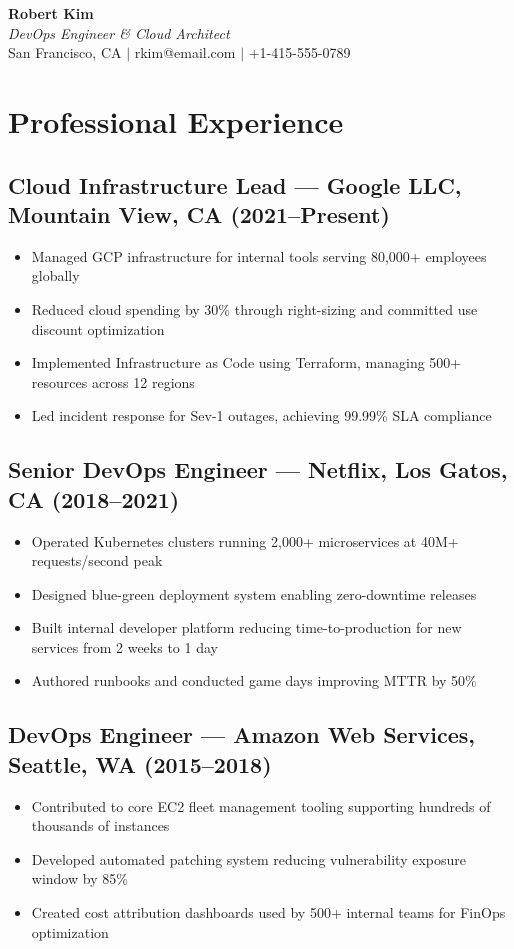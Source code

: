 \documentclass[10pt,letterpaper]{article}
\begin{document}
\begin{center}
  {\Huge\textbf{Robert Kim}} \\[6pt]
  \textit{DevOps Engineer \& Cloud Architect} \\[4pt]
  San Francisco, CA $|$ rkim@email.com $|$ +1-415-555-0789
\end{center}

\vspace{10pt}

\section{Professional Experience}

\subsection{Cloud Infrastructure Lead --- Google LLC, Mountain View, CA (2021--Present)}
\begin{itemize}[leftmargin=1.5em]
  \item Managed GCP infrastructure for internal tools serving 80,000+ employees globally
  \item Reduced cloud spending by 30\% through right-sizing and committed use discount optimization
  \item Implemented Infrastructure as Code using Terraform, managing 500+ resources across 12 regions
  \item Led incident response for Sev-1 outages, achieving 99.99\% SLA compliance
\end{itemize}

\subsection{Senior DevOps Engineer --- Netflix, Los Gatos, CA (2018--2021)}
\begin{itemize}[leftmargin=1.5em]
  \item Operated Kubernetes clusters running 2,000+ microservices at 40M+ requests/second peak
  \item Designed blue-green deployment system enabling zero-downtime releases
  \item Built internal developer platform reducing time-to-production for new services from 2 weeks to 1 day
  \item Authored runbooks and conducted game days improving MTTR by 50\%
\end{itemize}

\subsection{DevOps Engineer --- Amazon Web Services, Seattle, WA (2015--2018)}
\begin{itemize}[leftmargin=1.5em]
  \item Contributed to core EC2 fleet management tooling supporting hundreds of thousands of instances
  \item Developed automated patching system reducing vulnerability exposure window by 85\%
  \item Created cost attribution dashboards used by 500+ internal teams for FinOps optimization
\end{itemize}
\end{document}
